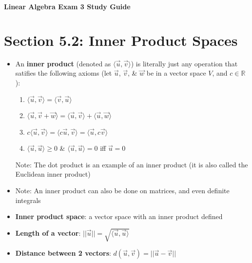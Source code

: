 \documentclass[15pt]{article}
\begin{document}
\begin{flushleft}

\begin{center}
    \bfseries\LARGE Linear Algebra Exam 3 Study Guide
\end{center}

\setlength{\parindent}{0.5in}

\section{\textbf{Section 5.2}: Inner Product Spaces}
\begin{itemize}
    \item An \textbf{inner product} (denoted as $\langle \vec{u},\vec{v} 
            \rangle$) is literally just any operation that satifies the 
            following axioms (let $\vec{u}$, $\vec{v}$, \& $\vec{w}$ be in a 
            vector space $V$, and $c \in \mathbb{R}$):
            \begin{enumerate}
                \item $\langle \vec{u},\vec{v} \rangle = \langle \vec{v},
                    \vec{u} \rangle$
                \item $\langle \vec{u},\vec{v} + \vec{w} \rangle = \langle 
                    \vec{u}, \vec{v} \rangle + \langle \vec{u},\vec{w} 
                    \rangle$
                \item $c \langle \vec{u},\vec{v} \rangle = \langle c\vec{u},
                    \vec{v} \rangle = \langle \vec{u},c\vec{v} \rangle$
                \item $\langle \vec{u},\vec{u} \rangle \geq 0$ \& $\langle 
                    \vec{u}, \vec{u} \rangle = 0 $ iff $\vec{u}=0$
            \end{enumerate}
            Note: The dot product is an example of an inner product (it is also 
            called the Euclidean inner product)
    \item Note: An inner product can also be done on matrices, and even
            definite integrals
    \item \textbf{Inner product space}: a vector space with an inner product
            defined
    \item \textbf{Length of a vector}: $||\vec{u}|| = \sqrt{\langle \vec{u},
            \vec{u} \rangle}$
    \item \textbf{Distance between 2 vectors}: $d(\vec{u},\vec{v})=||\vec{u}-
            \vec{v}||$

\end{itemize}
\end{flushleft}
\end{document}
